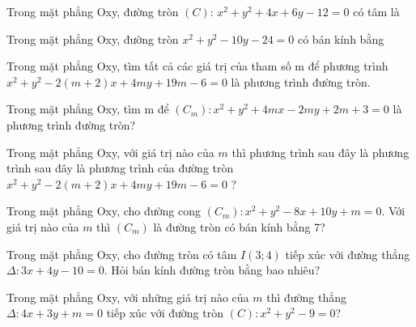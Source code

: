 \documentclass[12pt,a4paper]{book}
\begin{document}
\begin{ex}
Trong mặt phẳng Oxy, đường tròn $(C)$: $x^2 + y^2 + 4x + 6y - 12 = 0$ có tâm là
\loigiai{}
\end{ex}

\begin{ex}
Trong mặt phẳng Oxy, đường tròn $x^2 + y^2 - 10y - 24 = 0$ có bán kính bằng
\loigiai{}
\end{ex}

\begin{ex}
Trong mặt phẳng Oxy, tìm tất cả các giá trị của tham số m để phương trình $x^2 + y^2 - 2(m+2)x + 4my + 19m - 6 = 0$ là phương trình đường tròn.
\loigiai{}
\end{ex}

\begin{ex}
Trong mặt phẳng Oxy, tìm m để $(C_m): x^2 + y^2 + 4mx - 2my + 2m + 3 = 0$ là phương trình đường tròn?
\loigiai{}
\end{ex}

\begin{ex}
Trong mặt phẳng Oxy, với giá trị nào của $m$ thì phương trình sau đây là phương trình sau đây là phương trình của đường tròn $x^2 + y^2 - 2(m+2)x + 4my + 19m - 6 = 0$ ?
\loigiai{}
\end{ex}

\begin{ex}
Trong mặt phẳng Oxy, cho đường cong $(C_m): x^2 + y^2 - 8x + 10y + m = 0$. Với giá trị nào của $ m $ thì $(C_m)$ là đường tròn có bán kính bằng 7?
\loigiai{}
\end{ex}

\begin{ex}
Trong mặt phẳng Oxy, cho đường tròn có tâm $I(3;4)$ tiếp xúc với đường thẳng $\Delta: 3x + 4y - 10 = 0$. Hỏi bán kính đường tròn bằng bao nhiêu?
\loigiai{}
\end{ex}

\begin{ex}
Trong mặt phẳng Oxy, với những giá trị nào của $m$ thì đường thẳng $\Delta: 4x + 3y + m = 0$ tiếp xúc với đường tròn $(C): x^2 + y^2 - 9 = 0$?
\loigiai{}
\end{ex}
\end{document}
